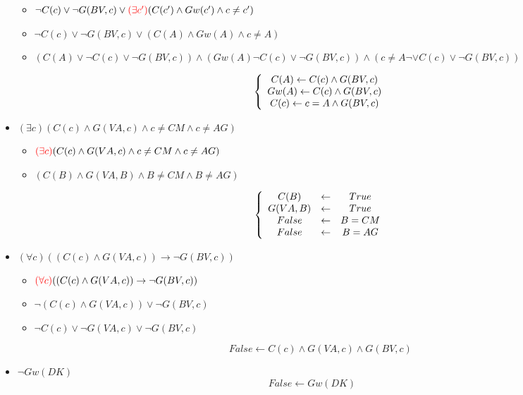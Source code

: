 \documentclass[alternative-exam.tex]{subfiles}
\begin{document}
\begin{itemize}
\begin{itemize}
\item $\neg C(c) \vee \neg G(BV,c) \vee {\color{red} (\exists c')} (C(c') \wedge Gw(c') \wedge c \neq c')$

\item $\neg C(c) \vee \neg G(BV,c) \vee (C(A) \wedge Gw(A) \wedge c \neq A)$

\item 
$(C(A)\vee \neg C(c) \vee \neg G(BV,c)) \wedge (Gw(A) \neg C(c) \vee \neg G(BV,c))\wedge (c \neq A\neg \vee C(c) \vee \neg G(BV,c))$

\[
\left\{
\begin{array}{c c c}
C(A)\leftarrow  C(c) \wedge  G(BV,c)\\
Gw(A) \leftarrow  C(c) \wedge  G(BV,c)\\
C(c) \leftarrow c = A \wedge G(BV,c)\\
\end{array}
\right.
\]
\end{itemize}

\item $(\exists c) (C(c) \wedge G(VA,c) \wedge c\neq CM \wedge c \neq AG)$
\begin{itemize}
\item ${\color{red}(\exists c)} (C(c) \wedge G(VA,c) \wedge c\neq CM \wedge c \neq AG)$

\item $(C(B) \wedge G(VA,B) \wedge B\neq CM \wedge B \neq AG)$

\[
\left\{
\begin{array}{c c c}
C(B) &\leftarrow& True\\
G(VA,B) &\leftarrow& True\\
False &\leftarrow& B = CM\\
False &\leftarrow& B = AG\\
\end{array}
\right.
\]
\end{itemize}

\item $(\forall c) ((C(c) \wedge G(VA,c)) \rightarrow \neg G(BV,c))$
\begin{itemize}
\item ${\color{red}(\forall c)} ((C(c) \wedge G(VA,c)) \rightarrow \neg G(BV,c))$

\item $\neg(C(c) \wedge G(VA,c)) \vee \neg G(BV,c)$

\item $\neg C(c) \vee \neg G(VA,c) \vee \neg G(BV,c)$

\[
False \leftarrow C(c) \wedge G(VA,c) \wedge G(BV,c)
\]
\end{itemize}

\item $\neg Gw(DK)$
\[
False \leftarrow Gw(DK)
\]
\end{itemize}
\end{document}
